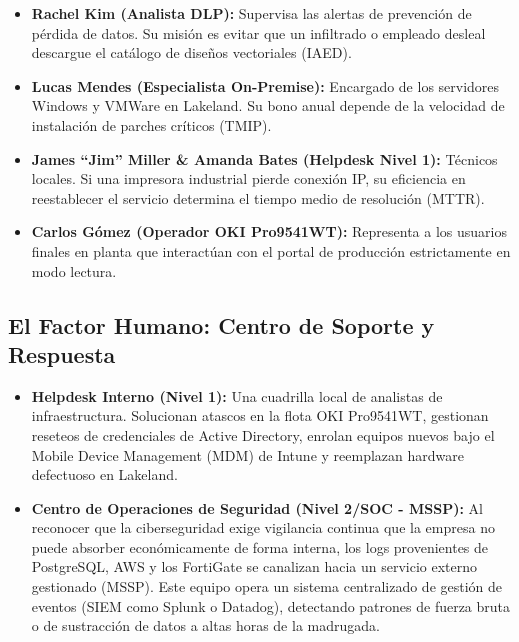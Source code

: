 \documentclass[11pt,a4paper]{article}
\begin{document}
\begin{itemize}
    \item \textbf{Rachel Kim (Analista DLP):} Supervisa las alertas de prevención de pérdida de datos. Su misión es evitar que un infiltrado o empleado desleal descargue el catálogo de diseños vectoriales (IAED).
    \item \textbf{Lucas Mendes (Especialista On-Premise):} Encargado de los servidores Windows y VMWare en Lakeland. Su bono anual depende de la velocidad de instalación de parches críticos (TMIP).
    \item \textbf{James \enquote{Jim} Miller \& Amanda Bates (Helpdesk Nivel 1):} Técnicos locales. Si una impresora industrial pierde conexión IP, su eficiencia en reestablecer el servicio determina el tiempo medio de resolución (MTTR).
    \item \textbf{Carlos Gómez (Operador OKI Pro9541WT):} Representa a los usuarios finales en planta que interactúan con el portal de producción estrictamente en modo lectura.
\end{itemize}

\subsection{El Factor Humano: Centro de Soporte y Respuesta}
\begin{itemize}
    \item \textbf{Helpdesk Interno (Nivel 1):} Una cuadrilla local de analistas de infraestructura. Solucionan atascos en la flota OKI Pro9541WT, gestionan reseteos de credenciales de Active Directory, enrolan equipos nuevos bajo el Mobile Device Management (MDM) de Intune y reemplazan hardware defectuoso en Lakeland.
    \item \textbf{Centro de Operaciones de Seguridad (Nivel 2/SOC - MSSP):} Al reconocer que la ciberseguridad exige vigilancia continua que la empresa no puede absorber económicamente de forma interna, los logs provenientes de PostgreSQL, AWS y los FortiGate se canalizan hacia un servicio externo gestionado (MSSP). Este equipo opera un sistema centralizado de gestión de eventos (SIEM como Splunk o Datadog), detectando patrones de fuerza bruta o de sustracción de datos a altas horas de la madrugada.
\end{itemize}
\end{document}
